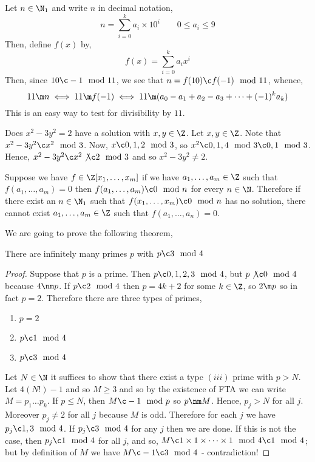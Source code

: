 \begin{eg}
  Let $n \in \N_1$ and write $n$ in decimal notation,
  $$ n = \sum_{i=0}^k a_i \times 10^i \qquad 0 \le a_i \le 9$$
  Then, define $f(x)$ by,
  $$ f(x) = \sum_{i=0}^k a_i x^i $$
  Then, since $10 \c -1\mod 11$, we see that $n = f(10) \c f(-1)\mod 11$, whence,
  $$ 11 \m n \iff 11 \m f(-1) \iff 11 \m (a_0 - a_1 + a_2 - a_3 + \dots + (-1)^k a_k) $$
  This is an easy way to test for divisibility by $11$.
\end{eg}

\begin{eg}
  Does $x^2 - 3y^2 = 2$ have a solution with $x, y \in \Z$. Let $x, y \in \Z$. Note that $x^2 - 3y^2 \c x^2 \mod 3$. Now, $x \c 0, 1, 2 \mod 3$, so $x^2 \c 0, 1, 4\mod 3 \c 0, 1\mod 3$. Hence, $x^2 - 3y^2 \c x^2 \not\c 2 \mod 3$ and so $x^2 - 3y^2 \ne 2$.
\end{eg}

\begin{remark}
  Suppose we have $f \in \Z[x_1, \dots, x_m]$ if we have $a_1, \dots, a_m \in \Z$ such that $f(a_1, \dots, a_m) = 0$ then $f(a_1, \dots, a_m) \c 0 \mod n$ for every $n \in \N$. Therefore if there exist an $n \in \N_1$ such that $f(x_1, \dots, x_m) \c 0 \mod n$ has no solution, there cannot exist $a_1, \dots, a_m \in \Z$ such that $f(a_1, \dots, a_n) = 0$.
\end{remark}

We are going to prove the following theorem,
\begin{nthm}
  There are infinitely many primes $p$ with $p \c 3\mod 4$
\end{nthm}
\begin{proof}
  Suppose that $p$ is a prime. Then $p \c 0, 1, 2, 3 \mod 4$, but $p \not\c 0 \mod 4$ because $4 \nm p$. If $p \c 2 \mod 4$ then $p = 4k + 2$ for some $k \in \Z$, so $2 \m p$ so in fact $p = 2$. Therefore there are three types of primes,
  \begin{enumerate}
    \item $p = 2$
    \item $p \c 1 \mod 4$
    \item $p \c 3 \mod 4$
  \end{enumerate}
  Let $N \in \N$ it suffices to show that there exist a type $(iii)$ prime with $p > N$. Let $4(N!) - 1$ and so $M \ge 3$ and so by the existence of FTA we can write $M = p_1\dots p_k$. If $p \le N$, then $M \c -1 \mod p$ so $p \nm M$. Hence, $p_j > N$ for all $j$. Moreover $p_j \ne 2$ for all $j$ because $M$ is odd. Therefore for each $j$ we have $p_j \c 1, 3 \mod 4$. If $p_j \c 3\mod 4$ for any $j$ then we are done. If this is not the case, then $p_j \c 1 \mod 4$ for all $j$, and so, $M \c 1 \times 1 \times \dots \times 1 \mod 4 \c 1 \mod 4$; but by definition of $M$ we have $M \c -1 \c 3 \mod 4$ - contradiction!
\end{proof}

